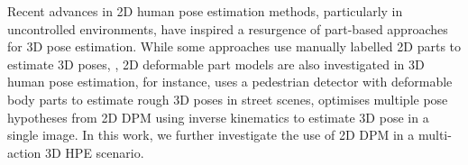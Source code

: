 Recent advances in 2D human pose estimation methods, particularly in uncontrolled environments, have inspired a resurgence of part-based approaches for 3D pose estimation. 
While some approaches use manually labelled 2D parts to estimate 3D poses, \eg \cite{Wei2009, Ramakrishna2012}, 
2D deformable part models are also investigated in 3D human pose estimation, for instance, \cite{Andriluka2010} uses a pedestrian detector with deformable body parts to estimate rough 3D poses in street scenes, 
\cite{Simo-Serra2012} optimises multiple pose hypotheses from 2D DPM using inverse kinematics to estimate 3D pose in a single image.
In this work, we further investigate the use of 2D DPM in a multi-action 3D HPE scenario. 


